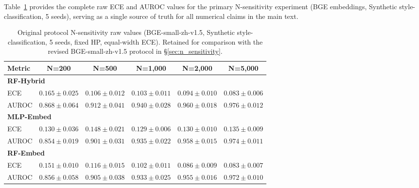 \documentclass[11pt]{article}
\begin{document}
Table~\ref{tab:master} provides the complete raw ECE and AUROC values for the primary N-sensitivity experiment (BGE embeddings, Synthetic style-classification, 5 seeds), serving as a single source of truth for all numerical claims in the main text.

\begin{table}[t]
\centering
\caption{Original protocol N-sensitivity raw values (BGE-small-zh-v1.5, Synthetic style-classification, 5 seeds, fixed HP, equal-width ECE). Retained for comparison with the revised BGE-small-zh-v1.5 protocol in §\ref{sec:n_sensitivity}.}
\label{tab:master}
\footnotesize
\begin{tabular}{@{}lccccc@{}}
\toprule
\textbf{Metric} & \textbf{N=200} & \textbf{N=500} & \textbf{N=1,000} & \textbf{N=2,000} & \textbf{N=5,000} \\
\midrule
\multicolumn{6}{l}{\textbf{RF-Hybrid}} \\
ECE & $0.165 \pm 0.025$ & $0.106 \pm 0.012$ & $0.103 \pm 0.011$ & $0.094 \pm 0.010$ & $0.083 \pm 0.006$ \\
AUROC & $0.868 \pm 0.064$ & $0.912 \pm 0.041$ & $0.940 \pm 0.028$ & $0.960 \pm 0.018$ & $0.976 \pm 0.012$ \\
\midrule
\multicolumn{6}{l}{\textbf{MLP-Embed}} \\
ECE & $0.130 \pm 0.036$ & $0.148 \pm 0.021$ & $0.129 \pm 0.006$ & $0.130 \pm 0.010$ & $0.135 \pm 0.009$ \\
AUROC & $0.854 \pm 0.019$ & $0.901 \pm 0.031$ & $0.935 \pm 0.022$ & $0.958 \pm 0.015$ & $0.974 \pm 0.011$ \\
\midrule
\multicolumn{6}{l}{\textbf{RF-Embed}} \\
ECE & $0.151 \pm 0.010$ & $0.116 \pm 0.015$ & $0.102 \pm 0.011$ & $0.086 \pm 0.009$ & $0.083 \pm 0.007$ \\
AUROC & $0.856 \pm 0.058$ & $0.905 \pm 0.038$ & $0.933 \pm 0.025$ & $0.955 \pm 0.016$ & $0.972 \pm 0.010$ \\
\bottomrule
\end{tabular}
\end{table}
\end{document}
